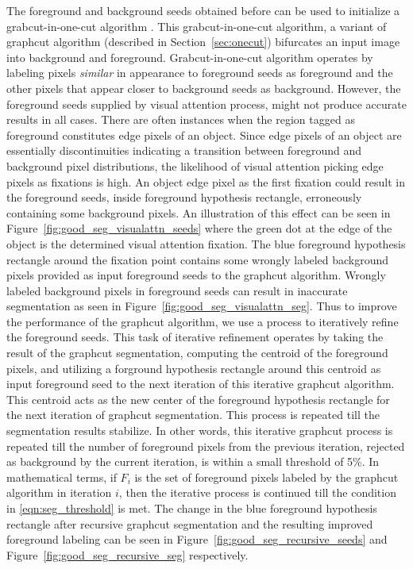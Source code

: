 \documentclass {udthesis}
\begin{document}
The foreground and background seeds obtained before can be used to initialize a grabcut-in-one-cut algorithm \cite{onecut}. This grabcut-in-one-cut algorithm, a variant of graphcut algorithm (described in Section~\ref{sec:onecut}) bifurcates an input image into background and foreground. Grabcut-in-one-cut algorithm operates by labeling pixels \textit{similar} in appearance to foreground seeds as foreground and the other pixels that appear closer to background seeds as background.
However, the foreground seeds supplied by visual attention process, might not produce accurate results in all cases. There are often instances when the region tagged as foreground constitutes edge pixels of an object. Since edge pixels of an object are essentially discontinuities indicating a transition between foreground and background pixel distributions, the likelihood of visual attention picking edge pixels as fixations is high. An object edge pixel as the first fixation could result in the foreground seeds, inside foreground hypothesis rectangle, erroneously containing some background pixels. An illustration of this effect can be seen in Figure~\ref{fig:good_seg_visualattn_seeds} where the green dot at the edge of the object is the determined visual attention fixation. The blue foreground hypothesis rectangle around the fixation point contains some wrongly labeled background pixels provided as input foreground 
seeds to the graphcut algorithm. Wrongly labeled background pixels in foreground seeds can result in inaccurate segmentation as seen in Figure~\ref{fig:good_seg_visualattn_seg}. Thus to improve the performance of the graphcut algorithm, we use a process to iteratively refine the foreground seeds. This task of iterative refinement operates by taking the result of the graphcut segmentation, computing the centroid of the foreground pixels, and utilizing a forground hypothesis rectangle around this centroid as input foreground seed to the next iteration of this iterative graphcut algorithm. This centroid acts as the new center of the foreground hypothesis rectangle for the next iteration of graphcut segmentation. This process is repeated till the segmentation results stabilize. In other words, this iterative graphcut process is repeated 
till the number of foreground pixels from the previous iteration, rejected as background by the current iteration, is within a small threshold of 5\%. In mathematical terms, if $F_i$ is the set of foreground pixels labeled by the graphcut algorithm in iteration $i$, then the iterative process is continued till the condition in \eqref{eqn:seg_threshold} is met. The change in the blue foreground hypothesis rectangle after recursive graphcut segmentation and the resulting improved foreground labeling can be seen in Figure~\ref{fig:good_seg_recursive_seeds} and Figure~\ref{fig:good_seg_recursive_seg} respectively.
\end{document}
